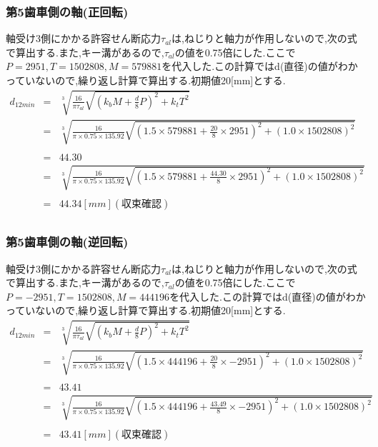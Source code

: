 \subsubsection{第5歯車側の軸(正回転)}
軸受け3側にかかる許容せん断応力$\tau_{al}$は,ねじりと軸力が作用しないので,次の式で算出する.また,キー溝があるので,$\tau_{al}$の値を0.75倍にした.ここで$P=2951,T=1502808, M=579881$を代入した.この計算ではd(直径)の値がわかっていないので,繰り返し計算で算出する.初期値20[mm]とする.
\begin{eqnarray}
d_{12min}&=& \sqrt [3]{ \frac{16}{\pi \tau_{al}}\sqrt{(k_bM+\frac{d}{8}P)^2+k_tT^2} }\\
       &=& \sqrt [3]{ \frac{16}{\pi \times 0.75 \times 135.92} \sqrt{(1.5 \times 579881 +\frac{20}{8}\times 2951)^2+(1.0 \times 1502808)^2} }\nonumber\\
\\
&=&44.30\\
       &=& \sqrt [3]{ \frac{16}{\pi \times 0.75 \times 135.92} \sqrt{(1.5 \times 579881 +\frac{44.30}{8}\times 2951)^2+(1.0 \times 1502808)^2} }\nonumber\\
\\
       &=& 44.34[mm](収束確認)\\
\end{eqnarray}
\subsubsection{第5歯車側の軸(逆回転)}
軸受け3側にかかる許容せん断応力$\tau_{al}$は,ねじりと軸力が作用しないので,次の式で算出する.また,キー溝があるので,$\tau_{al}$の値を0.75倍にした.ここで$P=-2951,T=1502808,M=444196$を代入した.この計算ではd(直径)の値がわかっていないので,繰り返し計算で算出する.初期値20[mm]とする.
\begin{eqnarray}
d_{12min}&=& \sqrt [3]{ \frac{16}{\pi \tau_{al}}\sqrt{(k_bM+\frac{d}{8}P)^2+k_tT^2} }\\
       &=& \sqrt [3]{ \frac{16}{\pi \times 0.75 \times 135.92} \sqrt{(1.5 \times 444196 +\frac{20}{8}\times -2951)^2+(1.0 \times 1502808)^2} }\nonumber\\
\\
&=& 43.41\\
       &=& \sqrt [3]{ \frac{16}{\pi \times 0.75 \times 135.92} \sqrt{(1.5 \times 444196 +\frac{43.49}{8}\times -2951)^2+(1.0 \times 1502808)^2} }\nonumber\\
\\
         &=& 43.41[mm](収束確認)
\end{eqnarray}

